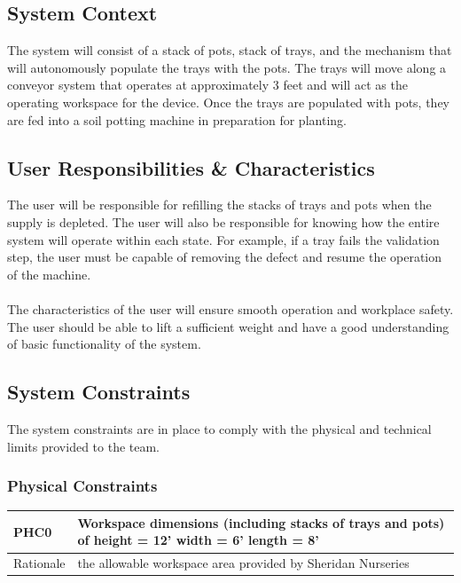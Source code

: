 \documentclass[12pt]{article}
\begin{document}
\subsection{System Context}
The system will consist of a stack of pots, stack of trays, and the mechanism that will 
autonomously populate the trays with the pots. The trays will move along a conveyor system that operates at approximately 3 feet 
and will act as the operating workspace for the device. Once the trays are populated with pots,
they are fed into a soil potting machine in preparation for planting.

\subsection{User Responsibilities \& Characteristics}

The user will be responsible for refilling the stacks of trays and pots when the supply is depleted. 
The user will also be responsible for knowing how the entire system will operate within each state. 
For example, if a tray fails the validation step, the user must be capable of removing the defect and resume the operation of the machine.\\\\
\noindent The characteristics of the user will ensure smooth operation and workplace safety. The user should be 
able to lift a sufficient weight and have a good understanding of basic functionality of the system.


\subsection{System Constraints}

The system constraints are in place to comply with the physical and 
technical limits provided to the team.

\subsubsection{Physical Constraints}
\begin{tabular}{ |p{2cm}|p{14cm}| }
  \hline
  PHC0 & Workspace dimensions (including stacks of 
  trays and pots) of height = 12' width = 6' length = 8'\\
  \hline
  Rationale & the allowable workspace area provided by Sheridan Nurseries  \\ 

  \hline  
 \end{tabular}\\\\
\end{document}
